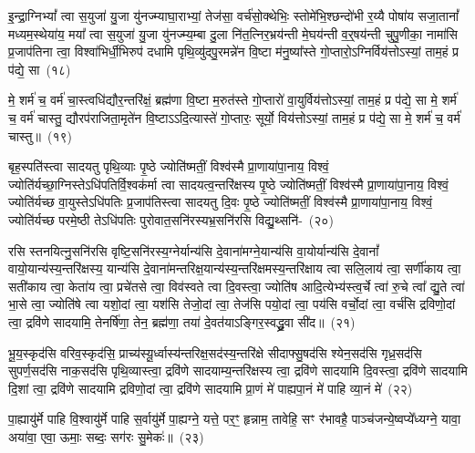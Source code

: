 इ॒न्द्रा॒ग्नि\-भ्यां᳚ त्वा स॒युजा॑ यु॒जा यु॑नज्म्याघा॒राभ्यां॒ तेज॑सा॒ वर्च॑सो॒क्थेभिः॒ स्तोमे॑भि॒श्छन्दो॑भी र॒य्यै पोषा॑य सजा॒तानां᳚ मध्यम॒स्थेया॑य॒ मया᳚ त्वा स॒युजा॑ यु॒जा यु॑नज्म्य॒म्बा दु॒ला नि॑त॒त्निर॒भ्रय॑न्ती मे॒घय॑न्ती व॒र्॒\mbox{}षय॑न्ती चुपु॒णीका॒ नामा॑सि प्र॒जा\-प॑तिना त्वा॒ विश्वा॑भिर्धी॒भिरुप॑ दधामि पृथि॒व्यु॑दपु॒रमन्ने॑न वि॒ष्टा म॑नु॒ष्या᳚स्ते गो॒प्तारो॒\-ऽग्निर्विय॑त्तो\-ऽस्यां॒ ताम॒हं प्र प॑द्ये॒ सा~(१८)\ip

मे॒ शर्म॑ च॒ वर्म॑ चा॒स्त्वधि॑द्यौर॒न्तरि॑क्षं॒ ब्रह्म॑णा वि॒ष्टा म॒रुत॑स्ते गो॒प्तारो॑ वा॒युर्विय॑त्तो\-ऽस्यां॒ ताम॒हं प्र प॑द्ये॒ सा मे॒ शर्म॑ च॒ वर्म॑ चास्तु॒ द्यौरप॑राजिता॒मृते॑न वि॒ष्टा\-ऽऽ\-दि॒त्यास्ते॑ गो॒प्तारः॒ सूर्यो॒ विय॑त्तो\-ऽस्यां॒ ताम॒हं प्र प॑द्ये॒ सा मे॒ शर्म॑ च॒ वर्म॑ चास्तु॥~(१९)\ip

{\anuvakamend[{सा\-ऽष्टाच॑त्वारिꣳशच्च}]}

बृह॒स्पति॑स्त्वा सादयतु पृथि॒व्याः पृ॒ष्ठे ज्योति॑ष्मतीं॒ विश्व॑स्मै प्रा॒णाया॑पा॒नाय॒ विश्वं॒ ज्योति॑र्यच्छा॒ग्निस्ते\-ऽधि॑\-पतिर्वि॒श्वक॑र्मा त्वा सादयत्व॒न्त\-रि॑क्षस्य पृ॒ष्ठे ज्योति॑ष्मतीं॒ विश्व॑स्मै प्रा॒णाया॑पा॒नाय॒ विश्वं॒ ज्योति॑र्यच्छ वा॒युस्ते\-ऽधि॑\-पतिः प्र॒जा\-प॑तिस्त्वा सादयतु दि॒वः पृ॒ष्ठे ज्योति॑ष्मतीं॒ विश्व॑स्मै प्रा॒णाया॑पा॒नाय॒ विश्वं॒ ज्योति॑र्यच्छ परमे॒ष्ठी ते\-ऽधि॑\-पतिः पुरोवात॒सनि॑रस्यभ्र॒सनि॑रसि विद्यु॒थ्सनि॑-~(२०)\ip

रसि स्तनयित्नु॒सनि॑रसि वृष्टि॒सनि॑रस्य॒ग्नेर्यान्य॑सि दे॒वाना॑\-मग्ने॒यान्य॑सि वा॒योर्यान्य॑सि दे॒वानां᳚ वायो॒यान्य॑स्य॒न्त\-रि॑क्षस्य॒ यान्य॑सि दे॒वाना॑\-मन्तरिक्ष॒यान्य॑स्य॒न्तरि॑क्षमस्य॒न्तरि॑क्षाय त्वा सलि॒लाय॑ त्वा॒ सर्णी॑काय त्वा॒ सती॑काय त्वा॒ केता॑य त्वा॒ प्रचे॑तसे त्वा॒ विव॑स्वते त्वा दि॒वस्त्वा॒ ज्योति॑ष आदि॒त्येभ्य॑स्त्व॒र्चे त्वा॑ रु॒चे त्वा᳚ द्यु॒ते त्वा॑ भा॒से त्वा॒ ज्योति॑षे त्वा यशो॒दां त्वा॒ यश॑सि तेजो॒दां त्वा॒ तेज॑सि पयो॒दां त्वा॒ पय॑सि वर्चो॒दां त्वा॒ वर्च॑सि द्रविणो॒दां त्वा॒ द्रवि॑णे सादयामि॒ तेनर्\mbox{}षि॑णा॒ तेन॒ ब्रह्म॑णा॒ तया॑ दे॒वत॑या\-ऽ\-ङ्गिर॒स्वद्ध्रु॒वा सी॑द॥~(२१)\ip

{\anuvakamend[{वि॒द्यु॒थ्सनि॑र्द्यु॒त्वैका॒न्नत्रि॒ꣳ॒शच्च॑}]}

भू॒य॒स्कृद॑सि वरिव॒स्कृद॑सि॒ प्राच्य॑स्यू॒र्ध्वास्य॑न्तरिक्ष॒सद॑स्य॒न्त\-रि॑क्षे सीदाफ्सु॒षद॑सि श्येन॒सद॑सि गृध्र॒सद॑सि सुपर्ण॒सद॑सि नाक॒सद॑सि पृथि॒व्यास्त्वा॒ द्रवि॑णे सादयाम्य॒न्त\-रि॑क्षस्य त्वा॒ द्रवि॑णे सादयामि दि॒वस्त्वा॒ द्रवि॑णे सादयामि दि॒शां त्वा॒ द्रवि॑णे सादयामि द्रविणो॒दां त्वा॒ द्रवि॑णे सादयामि प्रा॒णं मे॑ पाह्यपा॒नं मे॑ पाहि व्या॒नं मे॑~(२२)\ip

पा॒ह्यायु॑र्मे पाहि वि॒श्वायु॑र्मे पाहि स॒र्वायु॑र्मे पा॒ह्यग्ने॒ यत्ते॒ पर॒ꣳ॒ हृन्नाम॒ तावेहि॒ सꣳ र॑भावहै॒ पाञ्च॑जन्ये॒ष्वप्ये᳚ध्यग्ने॒ यावा॒ अया॑वा॒ एवा॒ ऊमाः॒ सब्दः॒ सग॑रः सु॒मेकः॑॥~(२३)\ip

